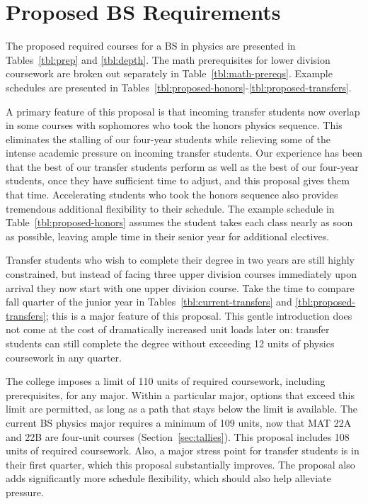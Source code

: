 \documentclass[12pt]{article}
\begin{document}
\newpage
\section{Proposed BS Requirements}
\label{sec:bs}

The proposed required courses for a BS in physics are presented in
Tables~\ref{tbl:prep} and \ref{tbl:depth}.  The math prerequisites for
lower division coursework are broken out separately in
Table~\ref{tbl:math-prereqs}.  Example schedules are presented in
Tables~\ref{tbl:proposed-honors}-\ref{tbl:proposed-transfers}.

A primary feature of this proposal is that incoming transfer students
now overlap in some courses with sophomores who took the honors
physics sequence.  This eliminates the stalling of our four-year
students while relieving some of the intense academic pressure on
incoming transfer students.  Our experience has been that the best of
our transfer students perform as well as the best of our four-year
students, once they have sufficient time to adjust, and this proposal
gives them that time.  Accelerating students who took the honors
sequence also provides tremendous additional flexibility to their
schedule.  The example schedule in Table~\ref{tbl:proposed-honors}
assumes the student takes each class nearly as soon as possible,
leaving ample time in their senior year for additional electives.

Transfer students who wish to complete their degree in two years are
still highly constrained, but instead of facing three upper division
courses immediately upon arrival they now start with one upper
division course.  Take the time to compare fall quarter of the junior
year in Tables~\ref{tbl:current-transfers} and
\ref{tbl:proposed-transfers}; this is a major feature of this
proposal.  This gentle introduction does not come at the cost of
dramatically increased unit loads later on: transfer students can
still complete the degree without exceeding 12 units of physics
coursework in any quarter.

The college imposes a limit of 110 units of required coursework, including prerequisites, for any
major.  Within a particular major, options that exceed this limit are permitted, as long as a path
that stays below the limit is available.  The current BS physics major requires a minimum of 109
units, now that MAT 22A and 22B are four-unit courses (Section~\ref{sec:tallies}).  This proposal includes 108 units of required
coursework.  Also, a major stress point for transfer students is in their first
quarter, which this proposal substantially improves.  The proposal also adds significantly more
schedule flexibility, which should also help alleviate pressure.
\end{document}
